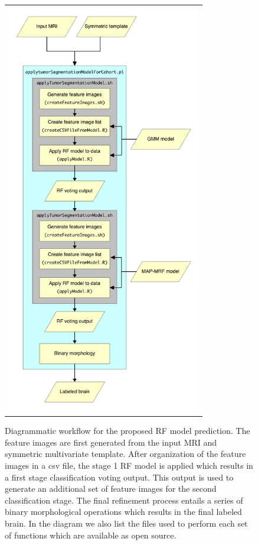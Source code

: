\documentclass[final,5p,times,twocolumn]{elsarticle}
\begin{document}
\begin{figure}
  \centering
  \begin{tabular}{c}
    \includegraphics[width=85mm]{Figures/pipeline.pdf}
  \end{tabular}
  \caption{Diagrammatic workflow for the proposed RF model prediction.  The feature
  images are first generated from the input MRI and symmetric multivariate template. 
  After organization of the feature images in a csv file, the stage 1 RF model is 
  applied which results in a first stage classification voting output.  This output
  is used to generate an additional set of feature images for the second classification
  stage.  The final refinement process entails a series of binary morphological 
  operations which results in the final labeled brain.  In the diagram we also list
  the files used to perform each set of functions which are available as open source.
  }
  \label{fig:pipeline}
\end{figure}
\end{document}
